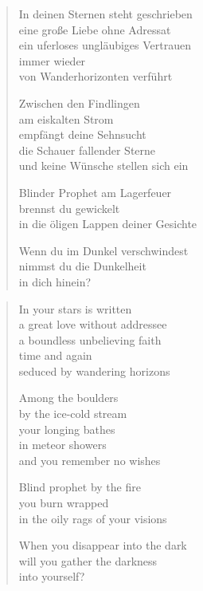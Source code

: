 
\cleartoverso


\begin{verse}

In deinen Sternen steht geschrieben\\
eine große Liebe ohne Adressat\\
ein uferloses ungläubiges Vertrauen\\
immer wieder\\
von Wanderhorizonten verführt

Zwischen den Findlingen\\
am eiskalten Strom\\
empfängt deine Sehnsucht\\
die Schauer fallender Sterne\\
und keine Wünsche stellen sich ein

Blinder Prophet am Lagerfeuer\\
brennst du gewickelt\\
in die öligen Lappen deiner Gesichte

Wenn du im Dunkel verschwindest\\
nimmst du die Dunkelheit\\
in dich hinein?

\end{verse}

\clearpage


\begin{verse}

In your stars is written\\
a great love without addressee\\
a boundless unbelieving faith\\
time and again\\
seduced by wandering horizons

Among the boulders\\
by the ice-cold stream\\
your longing bathes\\
in meteor showers\\
and you remember no wishes

Blind prophet by the fire\\
you burn wrapped\\
in the oily rags of your visions

When you disappear into the dark\\
will you gather the darkness\\
into yourself?

\end{verse}

